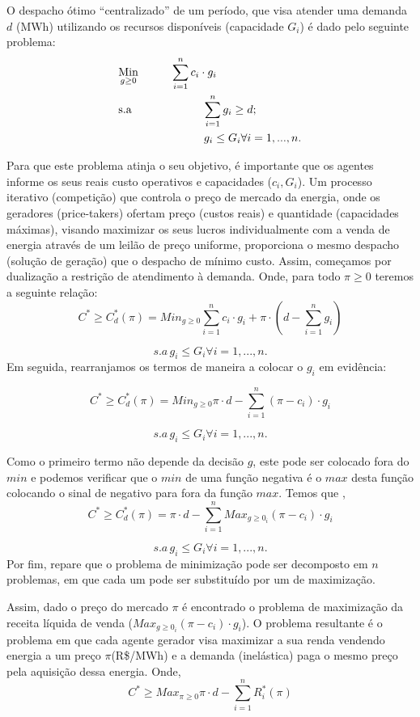 O despacho ótimo ``centralizado'' de um período, que visa atender
uma demanda $d$ (MWh) utilizando os recursos disponíveis (capacidade
$G_{i}$) é dado pelo seguinte problema:
\begin{align}
    & \underset{g\geq0}{\text{Min}} \hspace{1cm} \sum_{i=1}^{n}c_{i}\cdot g_{i} \label{eq12} \\
    & \text{s.a}  \hspace{2.2cm} \sum_{i=1}^{n}g_{i}\geq d; \label{eq13} \\
    &             \hspace{2.65cm}g_{i}\leq G_{i} \forall i=1,...,n. \label{eq14}
\end{align}

Para que este problema atinja o seu objetivo, é importante que os
agentes informe os seus reais custo operativos e capacidades ($c_{i},G_{i}$).
Um processo iterativo (competição) que controla o preço de mercado
da energia, onde os geradores (price-takers) ofertam preço (custos reais) e quantidade (capacidades máximas), visando maximizar os seus lucros individualmente com a venda de energia através de um leilão de preço uniforme, proporciona o mesmo despacho (solução de geração) que o despacho de
mínimo custo.
Assim, começamos por dualização a restrição de atendimento à demanda. Onde, para todo $\pi\geq0$ teremos a seguinte relação:
\[
C^{*}\geq C_{d}^{*}(\pi)=Min_{g\geq0}\sum_{i=1}^{n}c_{i}\cdot g_{i}+\pi\cdot\left(d-\sum_{i=1}^{n}g_{i}\right)
\]

\[
s.a \, g_{i}\leq G_{i}\forall i=1, ... ,n.
\]
Em seguida, rearranjamos os termos de maneira a colocar o $g_{i}$ em evidência:


\[
C^{*}\geq C_{d}^{*}(\pi)=Min_{g\geq0}\pi\cdot d-\sum_{i=1}^{n}(\pi-c_{i})\cdot g_{i}
\]


\[
s.a \, g_{i}\leq G_{i}\forall i=1,...,n.
\]


Como o primeiro termo não depende da decisão $g$, este pode ser colocado fora do  $min$ e podemos verificar que o $min$ de uma função negativa é o $max$ desta função colocando o sinal de negativo para fora da função $max$. Temos que ,
\[
C^{*}\geq C_{d}^{*}(\pi)=\pi\cdot d-\sum_{i=1}^{n}Max_{g\geq0_{i}}(\pi-c_{i})\cdot g_{i}
\]


\[
s.a \, g_{i}\leq G_{i}\forall i=1,...,n.
\]
Por fim, repare que o problema de minimização pode ser decomposto
em $n$ problemas, em que cada um pode ser substituído por um de maximização.

Assim, dado o preço do mercado $\pi$ é encontrado o problema de maximização da receita líquida de venda ($Max_{g\geq0_{i}}(\pi-c_{i})\cdot g_{i}$).
O problema resultante é o problema em que cada agente gerador visa maximizar a sua renda vendendo energia a um preço $\pi$(R\$/MWh) e a demanda (inelástica) paga o mesmo preço pela aquisição dessa energia.
Onde,
\[
C^{*}\geq Max_{\pi\geq0}\pi\cdot d-\sum_{i=1}^{n}R_{i}^{*}(\pi)
\]


